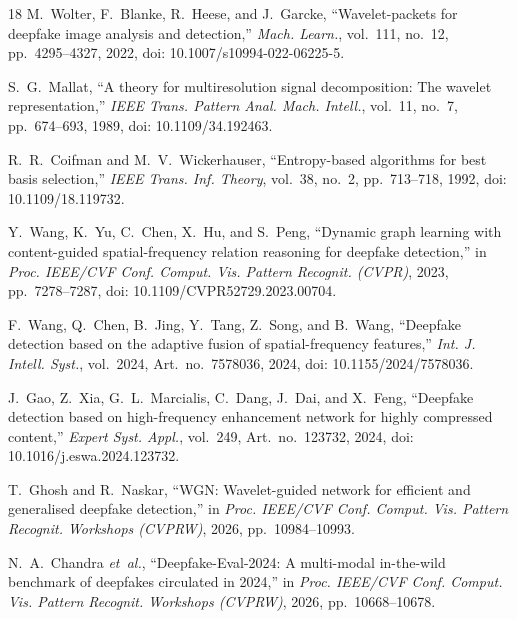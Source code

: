 \documentclass[11pt,a4paper]{article}
\providecommand{\href}[2]{#2}
\begin{document}
\begin{thebibliography}{18}
M.~Wolter, F.~Blanke, R.~Heese, and J.~Garcke,
``Wavelet-packets for deepfake image analysis and detection,''
\textit{Mach. Learn.}, vol.~111, no.~12, pp.~4295--4327, 2022,
doi: \href{https://doi.org/10.1007/s10994-022-06225-5}{10.1007/s10994-022-06225-5}.

S.~G.~Mallat,
``A theory for multiresolution signal decomposition: The wavelet representation,''
\textit{IEEE Trans. Pattern Anal. Mach. Intell.}, vol.~11, no.~7, pp.~674--693, 1989,
doi: \href{https://doi.org/10.1109/34.192463}{10.1109/34.192463}.

R.~R.~Coifman and M.~V.~Wickerhauser,
``Entropy-based algorithms for best basis selection,''
\textit{IEEE Trans. Inf. Theory}, vol.~38, no.~2, pp.~713--718, 1992,
doi: \href{https://doi.org/10.1109/18.119732}{10.1109/18.119732}.

Y.~Wang, K.~Yu, C.~Chen, X.~Hu, and S.~Peng,
``Dynamic graph learning with content-guided spatial-frequency relation reasoning for deepfake detection,''
in \textit{Proc. IEEE/CVF Conf. Comput. Vis. Pattern Recognit. (CVPR)}, 2023, pp.~7278--7287,
doi: \href{https://doi.org/10.1109/CVPR52729.2023.00704}{10.1109/CVPR52729.2023.00704}.

F.~Wang, Q.~Chen, B.~Jing, Y.~Tang, Z.~Song, and B.~Wang,
``Deepfake detection based on the adaptive fusion of spatial-frequency features,''
\textit{Int. J. Intell. Syst.}, vol.~2024, Art.~no.~7578036, 2024,
doi: \href{https://doi.org/10.1155/2024/7578036}{10.1155/2024/7578036}.

J.~Gao, Z.~Xia, G.~L.~Marcialis, C.~Dang, J.~Dai, and X.~Feng,
``Deepfake detection based on high-frequency enhancement network for highly compressed content,''
\textit{Expert Syst. Appl.}, vol.~249, Art.~no.~123732, 2024,
doi: \href{https://doi.org/10.1016/j.eswa.2024.123732}{10.1016/j.eswa.2024.123732}.

T.~Ghosh and R.~Naskar,
``WGN: Wavelet-guided network for efficient and generalised deepfake detection,''
in \textit{Proc. IEEE/CVF Conf. Comput. Vis. Pattern Recognit. Workshops (CVPRW)}, 2026, pp.~10984--10993.

N.~A.~Chandra \textit{et~al.},
``Deepfake-Eval-2024: A multi-modal in-the-wild benchmark of deepfakes circulated in 2024,''
in \textit{Proc. IEEE/CVF Conf. Comput. Vis. Pattern Recognit. Workshops (CVPRW)}, 2026, pp.~10668--10678.


\end{thebibliography}
\end{document}
